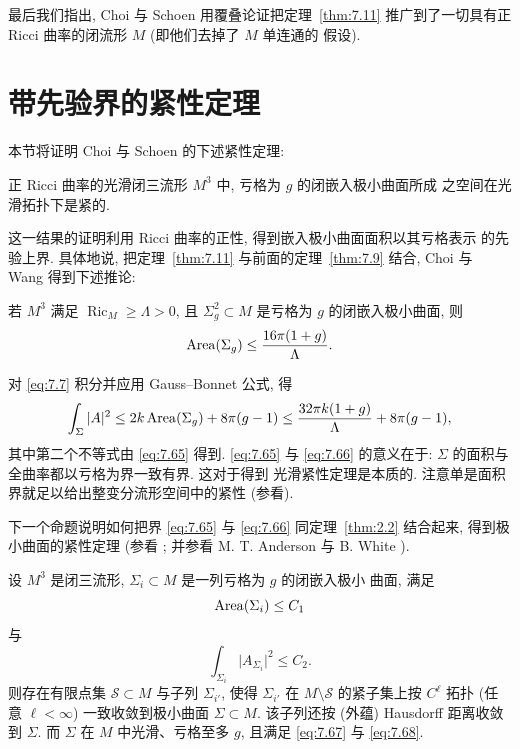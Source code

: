 最后我们指出, Choi 与 Schoen \cite{CiSc} 用覆叠论证把定理~\ref{thm:7.11}
推广到了一切具有正 Ricci 曲率的闭流形 $M$ (即他们去掉了 $M$ 单连通的
假设).

\section{带先验界的紧性定理}
\label{sec:7.5}

本节将证明 Choi 与 Schoen \cite{CiSc} 的下述紧性定理:

\begin{theorem}
\label{thm:7.12}
正 Ricci 曲率的光滑闭三流形 $M^3$ 中, 亏格为 $g$ 的闭嵌入极小曲面所成
之空间在光滑拓扑下是紧的.
\end{theorem}

这一结果的证明利用 Ricci 曲率的正性, 得到嵌入极小曲面面积以其亏格表示
的先验上界. 具体地说, 把定理~\ref{thm:7.11} 与前面的定理~\ref{thm:7.9}
结合, Choi 与 Wang 得到下述推论:

\begin{corollary}
\label{cor:7.13}
若 $M^3$ 满足 $\operatorname{Ric}_M\geq\Lambda>0$, 且
$\Sigma_g^2\subset M$ 是亏格为 $g$ 的闭嵌入极小曲面, 则
\begin{equation}
\operatorname{Area}(\Sigma_g)\leq\frac{16\pi(1+g)}{\Lambda}.
\label{eq:7.65}
\end{equation}
\end{corollary}

对 \eqref{eq:7.7} 积分并应用 Gauss--Bonnet 公式, 得
\begin{equation}
\int_{\Sigma}|A|^2
\leq2k\operatorname{Area}(\Sigma_g)+8\pi(g-1)
\leq\frac{32\pi k(1+g)}{\Lambda}+8\pi(g-1),
\label{eq:7.66}
\end{equation}
其中第二个不等式由 \eqref{eq:7.65} 得到. \eqref{eq:7.65} 与 \eqref{eq:7.66}
的意义在于: $\Sigma$ 的面积与全曲率都以亏格为界一致有界. 这对于得到
光滑紧性定理是本质的. 注意单是面积界就足以给出整变分流形空间中的紧性
(参看).

下一个命题说明如何把界 \eqref{eq:7.65} 与 \eqref{eq:7.66} 同定理~\ref{thm:2.2}
结合起来, 得到极小曲面的紧性定理 (参看 \cite{CiSc}; 并参看 M. T. Anderson
\cite{An} 与 B. White \cite{Wh1}).

\begin{proposition}
\label{prop:7.14}
设 $M^3$ 是闭三流形, $\Sigma_i\subset M$ 是一列亏格为 $g$ 的闭嵌入极小
曲面, 满足
\begin{equation}
\operatorname{Area}(\Sigma_i)\leq C_1
\label{eq:7.67}
\end{equation}
与
\begin{equation}
\int_{\Sigma_i}\bigl|A_{\Sigma_i}\bigr|^2\leq C_2.
\label{eq:7.68}
\end{equation}
则存在有限点集 $\mathcal{S}\subset M$ 与子列 $\Sigma_{i'}$, 使得
$\Sigma_{i'}$ 在 $M\setminus\mathcal{S}$ 的紧子集上按 $C^\ell$ 拓扑 (任意
$\ell<\infty$) 一致收敛到极小曲面 $\Sigma\subset M$. 该子列还按 (外蕴)
Hausdorff 距离收敛到 $\Sigma$. 而 $\Sigma$ 在 $M$ 中光滑、亏格至多 $g$,
且满足 \eqref{eq:7.67} 与 \eqref{eq:7.68}.
\end{proposition}

